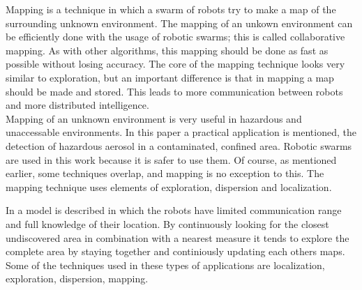
Mapping is a technique in which a swarm of robots try to make a map of the surrounding unknown environment. 
The mapping of an unkown environment can be efficiently done with the usage of robotic swarms; this is called collaborative mapping. 
As with other algorithms, this mapping should be done as fast as possible without losing accuracy. 
The core of the mapping technique looks very similar to exploration, but an important difference is that in mapping a map should be made and stored. 
This leads to more communication between robots and more distributed intelligence. \\

Mapping of an unknown environment is very useful in hazardous and unaccessable environments. \cite{hardin2004modified}
In this paper a practical application is mentioned, the detection of hazardous aerosol in a contaminated, confined area. 
Robotic swarms are used in this work because it is safer to use them. 
Of course, as mentioned earlier, some techniques overlap, and mapping is no exception to this. 
The mapping technique uses elements of exploration, dispersion and localization.  

In \cite{sheng2006distributed} a model is described in which the robots have limited communication range and full knowledge of their location. By continuously looking for the closest undiscovered area in combination with a nearest measure it tends to explore the complete area by staying together and continiously updating each others maps.
Some of the techniques used in these types of applications are localization, exploration, dispersion, mapping. \cite{sheng2006distributed,rothermich2005distributed} 